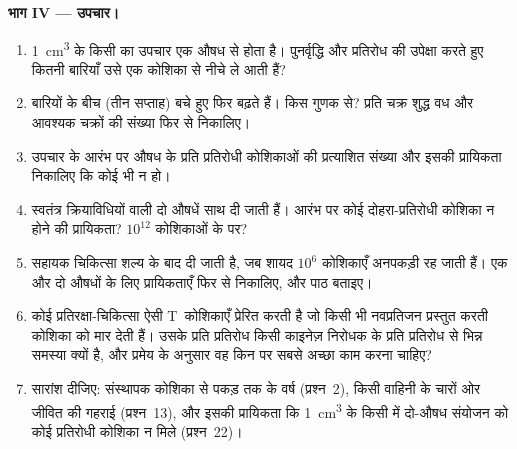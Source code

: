 \begin{problem}
\medskip
\noindent\textbf{भाग IV --- उपचार।}
\begin{enumerate}[resume]
  \item \qty{1}{cm^3} के किसी  का उपचार एक औषध से होता है।
        पुनर्वृद्धि और प्रतिरोध की उपेक्षा करते हुए कितनी बारियाँ उसे
        एक कोशिका से नीचे ले आती हैं?
  \item बारियों के बीच (तीन सप्ताह) बचे हुए फिर बढ़ते हैं। किस गुणक
        से? प्रति चक्र शुद्ध वध और आवश्यक चक्रों की संख्या फिर से
        निकालिए।
  \item उपचार के आरंभ पर औषध के प्रति प्रतिरोधी कोशिकाओं की प्रत्याशित
        संख्या और इसकी प्रायिकता निकालिए कि कोई भी न हो।
  \item स्वतंत्र क्रियाविधियों वाली दो औषधें साथ दी जाती हैं। आरंभ पर
        कोई दोहरा-प्रतिरोधी कोशिका न होने की प्रायिकता?
        $10^{12}$ कोशिकाओं के  पर?
  \item सहायक चिकित्सा शल्य के बाद दी जाती है, जब शायद $10^{6}$
        कोशिकाएँ अनपकड़ी रह जाती हैं। एक और दो औषधों के लिए
        प्रायिकताएँ फिर से निकालिए, और पाठ बताइए।
  \item कोई प्रतिरक्षा-चिकित्सा ऐसी T~कोशिकाएँ प्रेरित करती है जो
        किसी भी नवप्रतिजन प्रस्तुत करती कोशिका को मार देती हैं। उसके
        प्रति प्रतिरोध किसी काइनेज़ निरोधक के प्रति प्रतिरोध से भिन्न
        समस्या क्यों है, और प्रमेय के अनुसार वह किन  पर सबसे
        अच्छा काम करना चाहिए?
  \item सारांश दीजिए: संस्थापक कोशिका से पकड़ तक के वर्ष
        (प्रश्न~2), किसी वाहिनी के चारों ओर जीवित  की गहराई
        (प्रश्न~13), और इसकी प्रायिकता कि \qty{1}{cm^3} के किसी
         में दो-औषध संयोजन को कोई प्रतिरोधी कोशिका न मिले
        (प्रश्न~22)।
\end{enumerate}
\end{problem}
